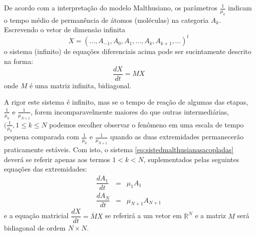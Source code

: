     De acordo com a interpretação do modelo Malthusiano, os parâmetros \(\frac{1}{\mu_k}\) indicam o tempo médio de permanência de átomos (moléculas) na categoria \(A_k\). Escrevendo o vetor de dimensão infinita
    \[X = (\ldots, A_{-1}, A_0, A_1, \ldots, A_k, A_{k+1}, \ldots)^t\]
    o sistema (infinito) de equações diferenciais acima pode ser sucintamente descrito na forma:
    \[\dfrac{dX}{dt} = M X\]
    onde \(M\) é uma matriz infinita, bidiagonal. 

    A rigor este sistema é infinito, mas se o tempo de reação de algumas das etapas, \(\frac{1}{\mu_{0}}\) e \(\frac{1}{\mu_{N+1}}\), forem incomparavelmente maiores do que outras intermediárias, \((\frac{1}{\mu_{k}}, 1 \le k \le N\) podemos escolher observar o fenômeno em uma escala de tempo pequena comparada com \(\frac{1}{\mu_{0}}\) e \(\frac{1}{\mu_{N+1}}\) quando as duas extremidades permanecerão praticamente estáveis. Com isto, o sistema \ref{eq:sistedmalthusianasacopladas} deverá se referir apenas aos termos \(1 < k < N\), suplementados pelas seguintes equações das extremidades:
    \begin{eqnarray}
    \dfrac{dA_1}{dt} &=& \mu_1 A_1 \\
    \dfrac{dA_N}{dt} &=& \mu_{N+1} A_{N+1}
    \end{eqnarray}
    e a equação matricial \(\dfrac{dX}{dt} = \overline{M} X\) se referirá a um vetor em \(\mathbb{R}^N\) e a matriz \(M\) será bidiagonal de ordem \(N \times N\).


